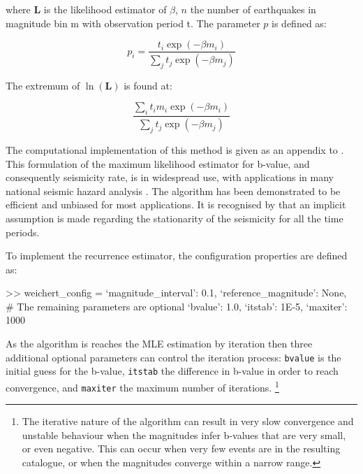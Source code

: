 where $\mathbf{L}$ is the likelihood estimator of $\beta$, $n$ the number of earthquakes in magnitude bin m with observation period t. The parameter $p$ is defined as:

\begin{equation}
   p_i = \frac{t_i \exp \left( {-\beta m_i} \right) }{\sum_j t_j \exp \left( {-\beta m_j} \right)}
\end{equation}

The extremum of $\ln \left( {\mathbf{L}}\right)$ is found at:

\begin{equation} 
   \frac{\sum_i t_i m_i \exp \left( {-\beta m_i} \right)}{\sum_j t_j \exp \left( {-\beta m_j} \right)}
\end{equation}

The computational implementation of this method is given as an appendix to \cite{Weichert1980}. This formulation of the maximum likelihood estimator for b-value, and consequently seismicity rate, is in widespread use, with applications in many national seismic hazard analysis \citep[e.g.][]{usgsNSHM1996,usgsNSHM2002}. The algorithm has been demonstrated to be efficient and unbiased for most applications. It is recognised by \citet{Felzer2008} that an implicit assumption is made regarding the stationarity of the seismicity for all the time periods. 

To implement the \cite{Weichert1980} recurrence estimator, the configuration properties are defined as:

\begin{python}[frame=single]

>> weichert_config = {`magnitude_interval': 0.1,
                      `reference_magnitude': None,
                      # The remaining parameters are optional
                      `bvalue': 1.0,
                      `itstab': 1E-5,
                      `maxiter': 1000}
\end{python}

As the \cite{Weichert1980} algorithm is reaches the MLE estimation by iteration then three additional optional parameters can control the iteration process: \verb=bvalue= is the initial guess for the b-value, \verb=itstab= the difference in b-value in order to reach convergence, and \verb=maxiter= the maximum number of iterations. \footnote{The iterative nature of the \cite{Weichert1980} algorithm can result in very slow convergence and unstable behaviour when the magnitudes infer b-values that are very small, or even negative. This can occur when very few events are in the resulting catalogue, or when the magnitudes converge within a narrow range.}



